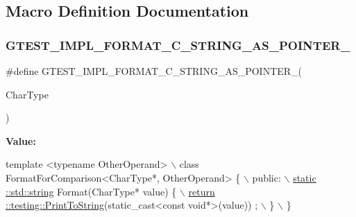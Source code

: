 \subsection{Macro Definition Documentation}
\mbox{\label{gtest-printers_8h_a79d4724b4bc2a1dd8493c366b5ca626a}} 
\subsubsection{\texorpdfstring{G\+T\+E\+S\+T\+\_\+\+I\+M\+P\+L\+\_\+\+F\+O\+R\+M\+A\+T\+\_\+\+C\+\_\+\+S\+T\+R\+I\+N\+G\+\_\+\+A\+S\+\_\+\+P\+O\+I\+N\+T\+E\+R\+\_\+}{GTEST\_IMPL\_FORMAT\_C\_STRING\_AS\_POINTER\_}}
{\footnotesize\ttfamily \#define G\+T\+E\+S\+T\+\_\+\+I\+M\+P\+L\+\_\+\+F\+O\+R\+M\+A\+T\+\_\+\+C\+\_\+\+S\+T\+R\+I\+N\+G\+\_\+\+A\+S\+\_\+\+P\+O\+I\+N\+T\+E\+R\+\_\+(\begin{DoxyParamCaption}\item[{}]{Char\+Type }\end{DoxyParamCaption})}

{\bfseries Value\+:}
\begin{DoxyCode}
\textcolor{keyword}{template} <\textcolor{keyword}{typename} OtherOperand>                                      \(\backslash\)
  class FormatForComparison<CharType*, OtherOperand> \{                  \(\backslash\)
   public:                                                              \hyperlink{namespacetesting_1_1internal_a8e8ff5b11e64078831112677156cb111}{\(\backslash\)}
\hyperlink{namespacetesting_1_1internal_a8e8ff5b11e64078831112677156cb111}{    static ::std::string} Format(CharType* value) \{                      
      \hyperlink{namespacetesting_aa5717bb1144edd1d262d310ba70c82ed}{\(\backslash\)}
\hyperlink{namespacetesting_aa5717bb1144edd1d262d310ba70c82ed}{      return ::testing::PrintToString}(static\_cast<const void*>(value))
      ; \(\backslash\)
    \}                                                                   \(\backslash\)
  \}
\end{DoxyCode}


